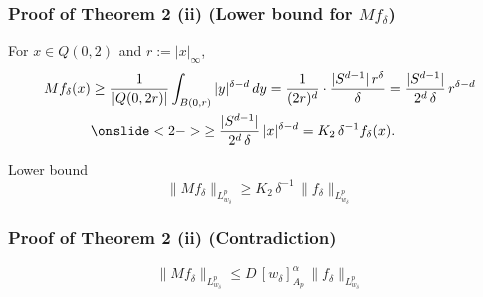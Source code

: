 \documentclass[aspectratio=1610]{beamer}
\begin{document}
\begin{frame}[t]
  \frametitle{Proof of Theorem 2 (ii) (Lower bound for $Mf_\delta$)}
For $x \in Q(0,2)$ and $r := |x|_\infty$,
\begin{align*}
  Mf_\delta(x) &\ge \frac{1}{|Q(0,2r)|}\int_{B(0,r)} |y|^{\delta-d}\,dy = \frac{1}{(2r)^d}\cdot\frac{|S^{d-1}|\,r^\delta}{\delta} = \frac{|S^{d-1}|}{2^d\,\delta}\,r^{\delta-d} \\
  &\onslide<2->{\ge \frac{|S^{d-1}|}{2^d\,\delta}\,|x|^{\delta-d} = K_2\,\delta^{-1} f_\delta(x).}
\end{align*}
\pause\pause
\begin{block}{Lower bound}
\vspace{-1.1em}
\[
  \|Mf_\delta\|_{L^p_{w_\delta}} \ge K_2\, \delta^{-1}\, \|f_\delta\|_{L^p_{w_\delta}}
\]
\end{block}
\end{frame}

\begin{frame}[t]
  \frametitle{Proof of Theorem 2 (ii) (Contradiction)}
{%
\[
  \|Mf_\delta\|_{L^p_{w_\delta}} \le D\, [w_\delta]_{A_p}^{\alpha}\, \|f_\delta\|_{L^p_{w_\delta}}
\]
}
\end{frame}

\begin{frame}[plain]
  \endpage
\end{frame}

\end{document}
